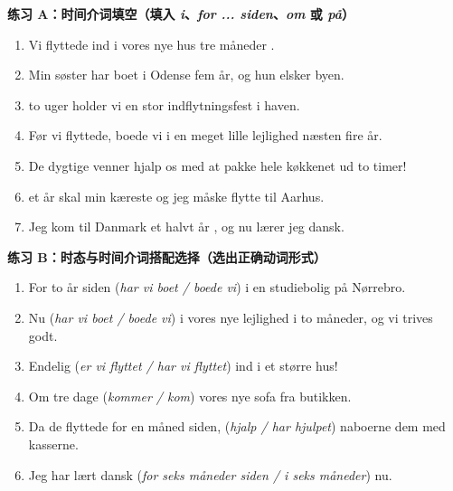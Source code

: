 \textbf{练习 A：时间介词填空（填入 \textit{i}、\textit{for ... siden}、\textit{om} 或 \textit{på}）}
\begin{enumerate}
  \item Vi flyttede ind i vores nye hus \underline{\hspace{1.1cm}} tre måneder \underline{\hspace{1.4cm}}.
  \item Min søster har boet i Odense \underline{\hspace{1.2cm}} fem år, og hun elsker byen.
  \item \underline{\hspace{1.2cm}} to uger holder vi en stor indflytningsfest i haven.
  \item Før vi flyttede, boede vi i en meget lille lejlighed \underline{\hspace{1.2cm}} næsten fire år.
  \item De dygtige venner hjalp os med at pakke hele køkkenet ud \underline{\hspace{1.2cm}} to timer!
  \item \underline{\hspace{1.2cm}} et år skal min kæreste og jeg måske flytte til Aarhus.
  \item Jeg kom til Danmark \underline{\hspace{1.1cm}} et halvt år \underline{\hspace{1.4cm}}, og nu lærer jeg dansk.
\end{enumerate}

\textbf{练习 B：时态与时间介词搭配选择（选出正确动词形式）}
\begin{enumerate}
  \item For to år siden \underline{\hspace{2.4cm}} (\textit{har vi boet / boede vi}) i en studiebolig på Nørrebro.
  \item Nu \underline{\hspace{2.4cm}} (\textit{har vi boet / boede vi}) i vores nye lejlighed i to måneder, og vi trives godt.
  \item Endelig \underline{\hspace{2.4cm}} (\textit{er vi flyttet / har vi flyttet}) ind i et større hus!
  \item Om tre dage \underline{\hspace{2.4cm}} (\textit{kommer / kom}) vores nye sofa fra butikken.
  \item Da de flyttede for en måned siden, \underline{\hspace{2.4cm}} (\textit{hjalp / har hjulpet}) naboerne dem med kasserne.
  \item Jeg har lært dansk \underline{\hspace{2.4cm}} (\textit{for seks måneder siden / i seks måneder}) nu.
\end{enumerate}

